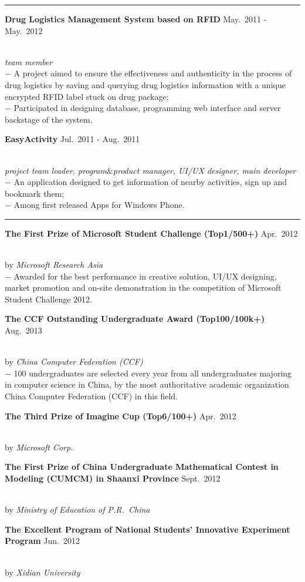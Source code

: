 \documentclass[a4paper,10pt]{article}
\newcommand{\shadedsection}[1]{
    \setlength{\fboxsep}{0pt}
    \colorbox{shadecolor}{%
        \begin{minipage}{\linewidth}%
            \vspace{0.2em}%
            #1%
        \end{minipage}%
    }
}
\newenvironment{rSection}[1]{ %
  \medskip
  \hspace{-1.5em}{\color{Blue}\MakeUppercase{\large \bf {#1}}} %
  \vspace{-0.2em}
  \medskip
  \hrule %
  \begin{list}{}{ %
    \setlength{\leftmargin}{1.5em} %
  }
\setlength{\itemsep}{1pt}
  \item[]
}{
  \end{list}
}
\newcommand{\detail}[1]{{$-$ {#1}}}
\newcommand{\period}[3]{\normalsize {#1} \hfill {#2} - {#3}}
\newcommand{\honor}[3]{\shadedsection{{\bf #1} \hfill {#2}}\\by {\em {#3}}}
\begin{document}
\begin{rSection}{Main Projects}
  \item
    \shadedsection{\period{\bf Drug Logistics Management System based on RFID}{May.~2011}{May.~2012}}\\
    {\em team member}\\
    \detail{A project aimed to ensure the effectiveness and authenticity in the process of drug logistics by saving and querying drug logistics information with a unique encrypted RFID label stuck on drug package;}\\%
    \detail{Participated in designing database, programming web interface and server backstage of the system.}

  \item
    \shadedsection{\period{\bf EasyActivity}{Jul.~2011}{Aug.~2011}}\\
    {\em project team leader, program$\&$product manager, UI/UX designer, main developer}\\
    \detail{An application designed to get information of nearby activities, sign up and bookmark them;}\\
    \detail{Among first released Apps for Windows Phone.}
\end{rSection}

\newpage

\vspace{-0.5em}

\begin{rSection}{Main Honors}
  \vspace{-1.5em}
  \item
    \honor{The First Prize of Microsoft Student Challenge (Top1/500+)}{Apr.~2012}{Microsoft Research Asia}\\
    \detail{Awarded for the best performance in creative solution, UI/UX designing, market promotion and on-site demonstration in the competition of Microsoft Student Challenge 2012.}\\
    \honor{The CCF Outstanding Undergraduate Award (Top100/100k+)}{Aug.~2013}{China Computer Federation (CCF)}\\
    \detail{100 undergraduates are selected every year from all undergraduates majoring in computer science in China, by the most authoritative academic organization China Computer Federation (CCF) in this field.}\\
    \honor{The Third Prize of Imagine Cup (Top6/100+)}{Apr.~2012}{Microsoft Corp.}\\
    \honor{The First Prize of China Undergraduate Mathematical Contest in Modeling (CUMCM) in Shaanxi Province}{Sept.~2012}{Ministry of Education of P.R.~China}\\
    \honor{The Excellent Program of National Students' Innovative Experiment Program}{Jun.~2012}{Xidian University}
\end{rSection}
\end{document}
